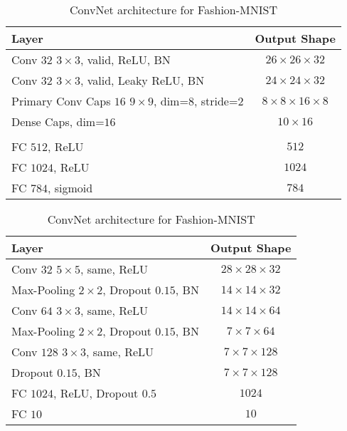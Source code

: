 \begin{table}
	\centering
	
	\begin{tabular}{lc}
		\toprule
		Layer	& Output Shape \\ 
		\midrule 
		Conv $32$ $3\times3$, valid, ReLU, BN	&  $26\times26\times32$ \\ 
		\midrule 
		Conv $32$ $3\times3$, valid, Leaky ReLU, BN	&  $24\times24\times32$\\ 
		\midrule 
		Primary Conv Caps $16$ $9\times9$, dim=$8$, stride=$2$ &  $8\times8\times16\times8$\\ 
		\midrule 
		Dense Caps, dim=$16$	&  $10\times16$\\ 
		\midrule 
		& \\
		\midrule
		FC $512$, ReLU	& $512$ \\
		\midrule
		FC $1024$, ReLU	& $1024$ \\
		\midrule
		FC $784$, sigmoid & $784$ \\
		\bottomrule
	\end{tabular}
	\caption{CapsNet architecture for Fashion-MNIST}
	\label{tab:capsnet:fashion}
	
	\vspace{0.75cm}
	
	\begin{tabular}{lc}
		\toprule 
		Layer	&  Output Shape \\ 
		\midrule
		Conv $32$ $5\times5$, same,	ReLU & $28\times28\times32$ \\ 
		\midrule
		Max-Pooling $2\times2$, Dropout $0.15$, BN	&  $14\times14\times32$ \\ 
		\midrule 
		Conv $64$ $3\times3$, same, ReLU	& $14\times14\times64$ \\ 
		\midrule 
		Max-Pooling $2\times2$, Dropout $0.15$, BN	& $7\times7\times64$ \\
		\midrule
		Conv $128$ $3\times3$, same, ReLU	& $7\times7\times128$ \\
		\midrule
		Dropout $0.15$, BN	& $7\times7\times128$ \\
		\midrule
		FC $1024$, ReLU, Dropout $0.5$ & $1024$ \\
		\midrule
		FC $10$ & $10$\\
		\bottomrule
	\end{tabular} 
	\caption{ConvNet architecture for Fashion-MNIST}
	\label{tab:convnet:fashion}
\end{table}


